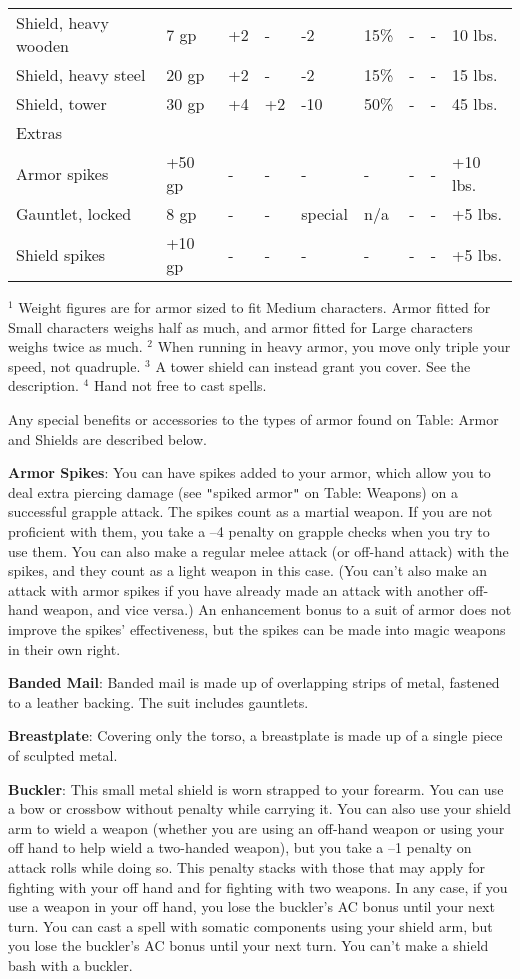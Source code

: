 \begin{table*}[]
\begin{tabular}{lllllllll}
 Shield, heavy wooden& 7 gp& +2& -& -2& 15\%& -& -& 10 lbs. \\
 Shield, heavy steel& 20 gp& +2& -& -2& 15\%& -& -& 15 lbs. \\
 Shield, tower& 30 gp& +4& +2& -10& 50\%& -& -& 45 lbs. \\
 Extras   \\
 Armor spikes& +50 gp& -& -& -& -& -& -& +10 lbs. \\
 Gauntlet, locked& 8 gp& -& -& special& n/a& -& -& +5 lbs. \\
 Shield spikes& +10 gp& -& -& -& -& -& -& +5 lbs.\\
\end{tabular}
\(^{1}\) Weight figures are for armor sized to fit Medium characters. Armor fitted for Small characters weighs half as much, and armor fitted for Large characters weighs twice as much.
\(^{2}\) When running in heavy armor, you move only triple your speed, not quadruple.
\(^{3}\) A tower shield can instead grant you cover. See the description.
\(^{4}\) Hand not free to cast spells.
\end{table*}
Any special benefits or accessories to the types of armor found on Table: Armor and Shields are described below.
		
\textbf{Armor Spikes}: You can have spikes added to your armor, which allow you to deal extra piercing damage (see \texttt{{}"{}}spiked armor\texttt{{}"{}} on Table: Weapons) on a successful grapple attack. The spikes count as a martial weapon. If you are not proficient with them, you take a --4 penalty on grapple checks when you try to use them. You can also make a regular melee attack (or off-hand attack) with the spikes, and they count as a light weapon in this case. (You can't also make an attack with armor spikes if you have already made an attack with another off-hand weapon, and vice versa.) An enhancement bonus to a suit of armor does not improve the spikes' effectiveness, but the spikes can be made into magic weapons in their own right.
		
\textbf{Banded Mail}: Banded mail is made up of overlapping strips of metal, fastened to a leather backing. The suit includes gauntlets.
		
\textbf{Breastplate}: Covering only the torso, a breastplate is made up of a single piece of sculpted metal.
		
\textbf{Buckler}: This small metal shield is worn strapped to your forearm. You can use a bow or crossbow without penalty while carrying it. You can also use your shield arm to wield a weapon (whether you are using an off-hand weapon or using your off hand to help wield a two-handed weapon), but you take a --1 penalty on attack rolls while doing so. This penalty stacks with those that may apply for fighting with your off hand and for fighting with two weapons. In any case, if you use a weapon in your off hand, you lose the buckler's AC bonus until your next turn. You can cast a spell with somatic components using your shield arm, but you lose the buckler's AC bonus until your next turn. You can't make a shield bash with a buckler.
		

